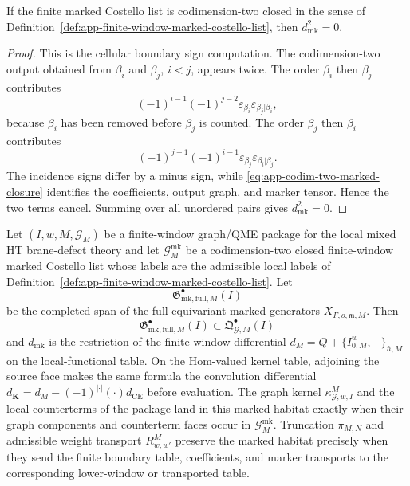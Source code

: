 \begin{lem}\label{lem:app-oriented-marked-incidence-signs}
  If the finite marked Costello list is codimension-two closed in the sense
  of Definition~\ref{def:app-finite-window-marked-costello-list}, then
  \(d_{\mathrm{mk}}^2=0\).
\end{lem}

\begin{proof}
  This is the cellular boundary sign computation.  The codimension-two
  output obtained from \(\beta_i\) and \(\beta_j\), \(i<j\), appears
  twice.  The order \(\beta_i\) then \(\beta_j\) contributes
  \[
    (-1)^{i-1}(-1)^{j-2}
    \varepsilon_{\beta_i}\varepsilon_{\beta_j|\beta_i},
  \]
  because \(\beta_i\) has been removed before \(\beta_j\) is counted.  The
  order \(\beta_j\) then \(\beta_i\) contributes
  \[
    (-1)^{j-1}(-1)^{i-1}
    \varepsilon_{\beta_j}\varepsilon_{\beta_i|\beta_j}.
  \]
  The incidence signs differ by a minus sign, while
  \eqref{eq:app-codim-two-marked-closure} identifies the coefficients,
  output graph, and marker tensor.  Hence the two terms cancel.  Summing
  over all unordered pairs gives \(d_{\mathrm{mk}}^2=0\).
\end{proof}

\begin{prop}
\label{prop:app-finite-window-marked-habitat-compatibility}
  Let \((I,w,M,\mathcal G_M)\) be a finite-window graph/QME package for
  the local mixed HT brane-defect theory and let
  \(\mathcal G^{\mathrm{mk}}_M\) be a codimension-two closed finite-window
  marked Costello list whose labels are the admissible local labels of
  Definition~\ref{def:app-finite-window-marked-costello-list}.  Let
  \[
    \mathfrak G^\bullet_{\mathrm{mk,full},M}(I)
  \]
  be the completed span of the full-equivariant marked generators
  \(X_{\Gamma,o,\mathfrak m,M}\).  Then
  \[
    \mathfrak G^\bullet_{\mathrm{mk,full},M}(I)
      \subset
    \mathfrak Q^\bullet_{\mathcal G,M}(I)
  \]
  and \(d_{\mathrm{mk}}\) is the restriction of the finite-window
  differential \(d_M=Q+\{I^w_{0,M},-\}_{\hbar,M}\) on the local-functional
  table.  On the Hom-valued kernel table, adjoining the source face makes
  the same formula the convolution differential
  \(d_{\mathbf K}=d_M-(-1)^{|\cdot|}(\cdot)d_{\mathrm{CE}}\) before
  evaluation.  The graph kernel
  \(\kappa^M_{\mathcal G,w,I}\) and the local counterterms of the package
  land in this marked habitat exactly when their graph components and
  counterterm faces occur in \(\mathcal G^{\mathrm{mk}}_M\).  Truncation
  \(\pi_{M,N}\) and admissible weight transport \(R^M_{w,w'}\) preserve the
  marked habitat precisely when they send the finite boundary table,
  coefficients, and marker transports to the corresponding lower-window or
  transported table.
\end{prop}

